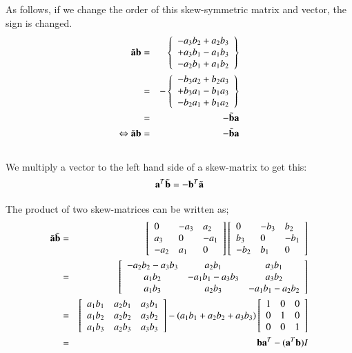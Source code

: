 As follows, if we change the order of this skew-symmetric matrix and vector, the sign is changed.
%
\begin{eqnarray}
\tilde{\mathbf{a}}\mathbf{b}
&=&
\left\{\begin{array}{l}
-a_3b_2+a_2b_3\\
+a_3b_1-a_1b_3\\
-a_2b_1+a_1b_2
\end{array}\right\} \\
&=&
-\left\{\begin{array}{l}
-b_3a_2+b_2a_3\\
+b_3a_1-b_1a_3\\
-b_2a_1+b_1a_2
\end{array}\right\}\\
&=&
-\tilde{\mathbf{b}}\mathbf{a}\\
\Leftrightarrow \tilde{\mathbf{a}}\mathbf{b} &=& -\tilde{\mathbf{b}}\mathbf{a}
\end{eqnarray}\\

We multiply a vector to the left hand side of a skew-matrix to get this:
%
\begin{equation}
\mathbf{a}^T\tilde{\mathbf{b}} = -\mathbf{b}^T\tilde{\mathbf{a}}
\end{equation}

The product of two skew-matrices can be written as;
\begin{eqnarray}
\tilde{\mathbf{a}}\tilde{\mathbf{b}}
&=&
\left[\begin{array}{lll}
0 & -a_3 & a_2 \\
a_3 & 0 & -a_1 \\
-a_2 & a_1 & 0
\end{array}\right]
\left[\begin{array}{lll}
0 & -b_3 & b_2 \\
b_3 & 0 & -b_1 \\
-b_2 & b_1 & 0
\end{array}\right]\\
&=&
\left[\begin{array}{ccc}
-a_2b_2-a_3b_3 & a_2b_1 & a_3b_1 \\
a_1b_2 & -a_1b_1-a_3b_3 & a_3b_2 \\
a_1b_3 & a_2b_3 & -a_1b_1-a_2b_2
\end{array}\right]\\
&=&
\left[\begin{array}{ccc}
a_1b_1 & a_2b_1 & a_3b_1 \\
a_1b_2 & a_2b_2 & a_3b_2 \\
a_1b_3 & a_2b_3 & a_3b_3
\end{array}\right]
-(a_1b_1+a_2b_2+a_3b_3)\left[\begin{array}{lll}
1 & 0 & 0\\
0 & 1 & 0 \\
0 & 0 & 1
\end{array}\right]\\
&=& \mathbf{b}\mathbf{a}^T-(\mathbf{a}^T\mathbf{b})I
\end{eqnarray}

